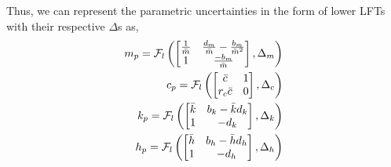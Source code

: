 Thus, we can represent the parametric uncertainties in the form of lower LFTs with their respective $\Delta$s as,
\begin{align*}
    m_p = \mathcal{F}_l\left(\begin{bmatrix}
        \frac{1}{\Bar{m}}&\frac{d_m}{\Bar{m}} - \frac{b_m}{\Bar{m}^2}\\
        1&\frac{-b_m}{\Bar{m}}
    \end{bmatrix},\Delta_m\right)\\
    c_p = \mathcal{F}_l\left(\begin{bmatrix}
        \Bar{c}&1\\
        r_c\Bar{c}&0
    \end{bmatrix},\Delta_c\right)\\
    k_p = \mathcal{F}_l\left(\begin{bmatrix}
        \Bar{k}&b_k-\Bar{k}d_k\\
        1&-d_k
    \end{bmatrix},\Delta_k\right)\\
    h_p = \mathcal{F}_l\left(\begin{bmatrix}
        \Bar{h}&b_h-\Bar{h}d_h\\
        1&-d_h
    \end{bmatrix},\Delta_h\right)\\
\end{align*}
